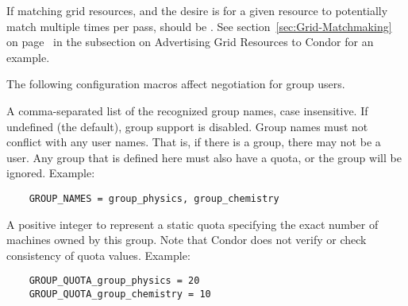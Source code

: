 \begin{description}
  If matching grid resources, and the desire is for a
  given resource to potentially match multiple times per 
  pass,  should be .
  See section~\ref{sec:Grid-Matchmaking} on page~\pageref{sec:Grid-Matchmaking}
  in the subsection on Advertising Grid Resources to Condor for an example.

\end{description}

The following configuration macros affect negotiation for group users.
\begin{description}

\label{param:GroupNames}
\item[\Macro{GROUP\_NAMES}]
  A comma-separated list of the recognized group names, case insensitive.
  If undefined (the default), group support is disabled.
  Group names must not conflict with any user names.
  That is, if there is a \verb@physics@ group, there may not be
  a \verb@physics@ user.
  Any group that is defined here must also have a quota,
  or the group will be ignored. Example: 
  \begin{verbatim}
    GROUP_NAMES = group_physics, group_chemistry 
  \end{verbatim}

\label{param:GroupQuotaGroupname}
\item[\Macro{GROUP\_QUOTA\_<groupname>}]
  A positive integer  to represent a static quota specifying
  the exact number of machines owned by this group.
  Note that Condor does not verify or check consistency of quota values.
  Example:
  \begin{verbatim}
    GROUP_QUOTA_group_physics = 20
    GROUP_QUOTA_group_chemistry = 10
  \end{verbatim}

%



\end{description}
